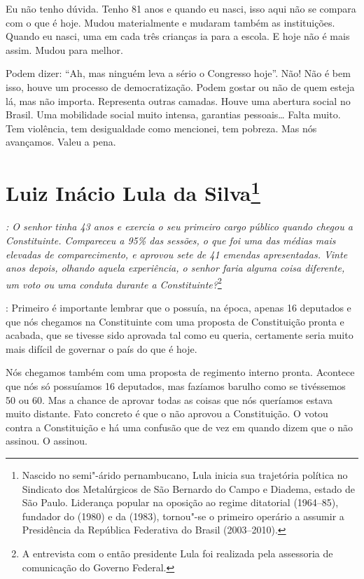 Eu não tenho dúvida. Tenho 81 anos e quando eu nasci, isso
aqui não se compara com o que é hoje. Mudou materialmente e mudaram
também as instituições. Quando eu nasci, uma em cada três crianças ia
para a escola. E hoje não é mais assim. Mudou para melhor.

Podem dizer: ``Ah, mas ninguém leva a sério o Congresso hoje''. Não! Não é
bem isso, houve um processo de democratização. Podem gostar ou não de
quem esteja lá, mas não importa. Representa outras camadas. Houve uma
abertura social no Brasil. Uma mobilidade social muito intensa,
garantias pessoais\ldots{} Falta muito. Tem violência, tem desigualdade como
mencionei, tem pobreza. Mas nós avançamos. Valeu a pena.

\chapter{Luiz Inácio Lula da Silva\footnote{Nascido no semi"-árido pernambucano, Lula inicia sua trajetória política
no Sindicato dos Metalúrgicos de São Bernardo do Campo e Diadema, estado
de São Paulo. Liderança popular na oposição ao regime ditatorial
(1964--85), fundador do  (1980) e da  (1983), tornou"-se o primeiro
operário a assumir a Presidência da República Federativa do Brasil
(2003--2010).}}

\emph{: O senhor tinha 43 anos e exercia o seu primeiro cargo público
quando chegou a Constituinte. Compareceu a 95\% das sessões, o que foi
uma das médias mais elevadas de comparecimento, e aprovou sete de 41
emendas apresentadas. Vinte anos depois, olhando aquela experiência, o
senhor faria alguma coisa diferente, um voto ou uma conduta durante a
Constituinte?}\footnote{A entrevista com o então presidente Lula foi realizada pela
assessoria de comunicação do Governo Federal.}

: Primeiro é importante lembrar que o
 possuía, na época, apenas 16 deputados e que nós chegamos na
Constituinte com uma proposta de Constituição pronta e acabada, que se
tivesse sido aprovada tal como eu queria, certamente seria muito mais
difícil de governar o país do que é hoje.

Nós chegamos também com uma proposta de regimento interno pronta.
Acontece que nós só possuíamos 16 deputados, mas fazíamos barulho como
se tivéssemos 50 ou 60. Mas a chance de aprovar todas as coisas que nós
queríamos estava muito distante. Fato concreto é que o  não aprovou a
Constituição. O  votou contra a Constituição e há uma confusão que de
vez em quando dizem que o  não assinou. O  assinou.

